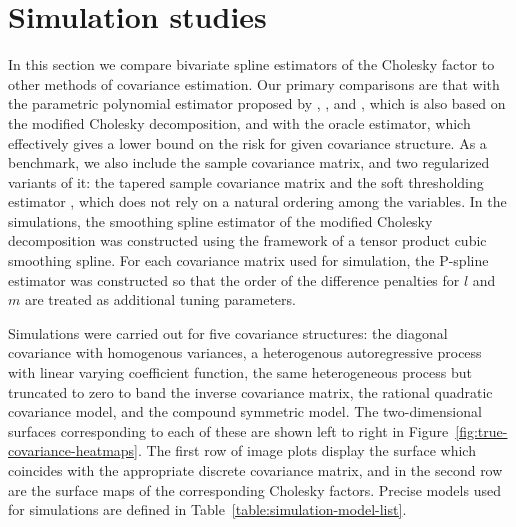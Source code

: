 \chapter{Simulation studies} \label{simulation-studies-chapter}


In this section we compare bivariate spline estimators of the Cholesky factor to other methods of covariance estimation. Our primary comparisons are that with the parametric polynomial estimator proposed by \cite{pourahmadi1999joint},  \cite{pan2003modelling}, and \cite{pourahmadi2002dynamic}, which is also based on the modified Cholesky decomposition, and with the oracle estimator, which effectively gives a lower bound on the risk for given covariance structure. As a benchmark, we also include the sample covariance matrix, and two regularized variants of it: the tapered sample covariance matrix \citep{cai2010optimal} and the soft thresholding estimator \citep{rothman2009generalized}, which does not rely on a natural ordering among the variables. In the simulations, the smoothing spline estimator of the modified Cholesky decomposition was constructed using the framework of a tensor product cubic smoothing spline. For each covariance matrix used for simulation, the P-spline estimator was constructed so that the order of the difference penalties for $l$ and $m$ are treated as additional tuning parameters.

\bigskip

Simulations were carried out for five covariance structures: the diagonal covariance with homogenous variances, a heterogenous autoregressive process with linear varying coefficient function, the same heterogeneous process but truncated to zero to band the inverse covariance matrix, the rational quadratic covariance model, and the compound symmetric model. The two-dimensional surfaces corresponding to each of these are shown left to right in Figure~\ref{fig:true-covariance-heatmaps}. The first row of image plots display the surface which coincides with the appropriate discrete covariance matrix, and in the second row are the surface maps of the corresponding Cholesky factors. Precise models used for simulations are defined in Table~\ref{table:simulation-model-list}. 

